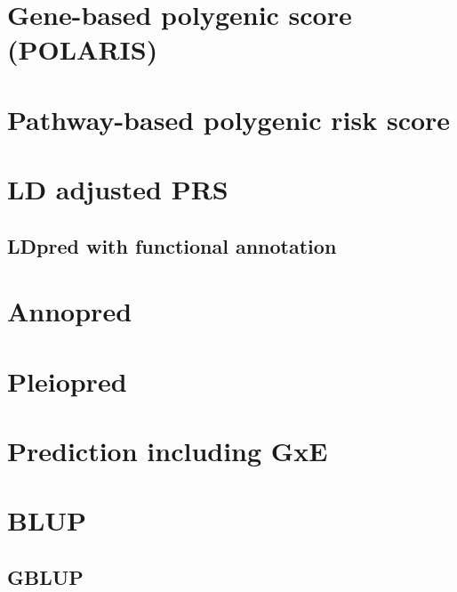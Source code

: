 \documentclass[
]{book}
\begin{document}
\hypertarget{gene-based-polygenic-score-polaris}{%
\section{Gene-based polygenic score (POLARIS)}\label{gene-based-polygenic-score-polaris}}

\hypertarget{pathway-based-polygenic-risk-score}{%
\section{Pathway-based polygenic risk score}\label{pathway-based-polygenic-risk-score}}

\hypertarget{ld-adjusted-prs}{%
\section{LD adjusted PRS}\label{ld-adjusted-prs}}

\hypertarget{ldpred-with-functional-annotation}{%
\subsection{LDpred with functional annotation}\label{ldpred-with-functional-annotation}}

\hypertarget{annopred}{%
\section{Annopred}\label{annopred}}

\hypertarget{pleiopred}{%
\section{Pleiopred}\label{pleiopred}}

\hypertarget{prediction-including-gxe}{%
\section{Prediction including GxE}\label{prediction-including-gxe}}

\hypertarget{blup}{%
\section{BLUP}\label{blup}}

\hypertarget{gblup}{%
\subsection{GBLUP}\label{gblup}}
\end{document}
